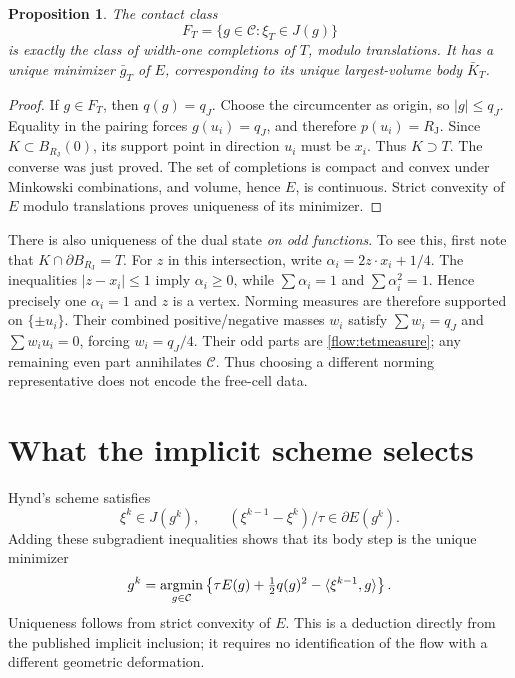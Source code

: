 \documentclass[11pt]{article}
\newtheorem{proposition}[theorem]{Proposition}
\theoremstyle{remark}\newtheorem{remark}[theorem]{Remark}
\newcommand{\RJ}{R_{\mathrm J}}
\newcommand{\C}{\mathcal C}
\begin{document}
\begin{proposition}\label{flow:face}
The contact class
\[
 F_T=\{g\in\C:\xi_T\in J(g)\}
\]
is exactly the class of width-one completions of $T$, modulo translations. It has a unique minimizer $\bar g_T$ of $E$, corresponding to its unique largest-volume body $\bar K_T$.
\end{proposition}
\begin{proof}
If $g\in F_T$, then $q(g)=q_J$. Choose the circumcenter as origin, so $|g|\leq q_J$. Equality in the pairing forces $g(u_i)=q_J$, and therefore $p(u_i)=\RJ$. Since $K\subset B_{\RJ}(0)$, its support point in direction $u_i$ must be $x_i$. Thus $K\supset T$. The converse was just proved. The set of completions is compact and convex under Minkowski combinations, and volume, hence $E$, is continuous. Strict convexity of $E$ modulo translations proves uniqueness of its minimizer.
\end{proof}
There is also uniqueness of the dual state \emph{on odd functions}. To see this, first note that $K\cap\partial B_{\RJ}=T$. For $z$ in this intersection, write
$\alpha_i=2z\cdot x_i+1/4$. The inequalities $|z-x_i|\leq1$ imply $\alpha_i\geq0$, while
$\sum\alpha_i=1$ and $\sum\alpha_i^2=1$. Hence precisely one $\alpha_i=1$ and $z$ is a vertex. Norming measures are therefore supported on $\{\pm u_i\}$. Their combined positive/negative masses $w_i$ satisfy $\sum w_i=q_J$ and $\sum w_i u_i=0$, forcing $w_i=q_J/4$. Their odd parts are \eqref{flow:tetmeasure}; any remaining even part annihilates $\C$. Thus choosing a different norming representative does not encode the free-cell data.

\section{What the implicit scheme selects}
Hynd's scheme satisfies
\[
 \xi^k\in J(g^k),\qquad
 (\xi^{k-1}-\xi^k)/\tau\in\partial E(g^k).
\]
Adding these subgradient inequalities shows that its body step is the unique minimizer
\begin{equation}\label{flow:primalstep}
 g^k=\mathop{\rm argmin}_{g\in\C}
 \left\{\tau E(g)+\tfrac12q(g)^2-\langle\xi^{k-1},g\rangle\right\}.
\end{equation}
Uniqueness follows from strict convexity of $E$. This is a deduction directly from the published implicit inclusion; it requires no identification of the flow with a different geometric deformation.
\end{document}
